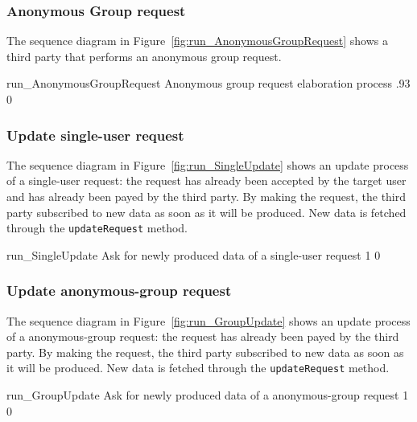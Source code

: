\documentclass[../DD0.tex]{subfiles}
\begin{document}
    \clearpage
    \subsubsection{Anonymous Group request}
    \label{sec:anonymousgroup}

      The sequence diagram in Figure~\ref{fig:run_AnonymousGroupRequest} shows a third party that performs an anonymous group request.

      \fetchUML
        {run_AnonymousGroupRequest}
        {Anonymous group request elaboration process}
        {.93}           %
        {0}           %

    \clearpage

    \subsubsection{Update single-user request}
    \label{sec:updatesingledata}

      The sequence diagram in Figure~\ref{fig:run_SingleUpdate} shows an update process of a single-user request: the request has already been accepted by the target user and has already been payed by the third party. By making the request, the third party subscribed to new data as soon as it will be produced. New data is fetched through the \texttt{updateRequest} method.

      \fetchUML
        {run_SingleUpdate}
        {Ask for newly produced data of a single-user request}
        {1}           %
        {0}           %

  \clearpage

  \subsubsection{Update anonymous-group request}
    \label{sec:updatedata}

      The sequence diagram in Figure~\ref{fig:run_GroupUpdate} shows an update process of a anonymous-group request: the request has already been payed by the third party. By making the request, the third party subscribed to new data as soon as it will be produced. New data is fetched through the \texttt{updateRequest} method.

      \fetchUML
        {run_GroupUpdate}
        {Ask for newly produced data of a anonymous-group request}
        {1}           %
        {0}           %

  \clearpage
\end{document}
